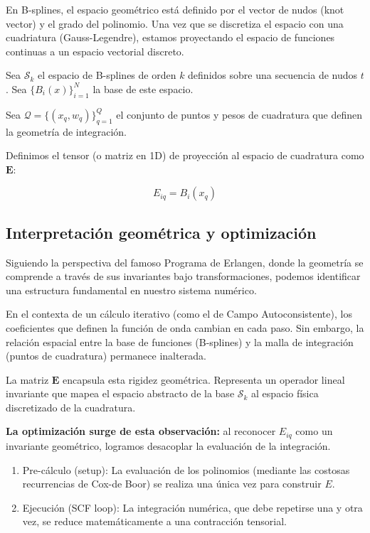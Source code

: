 \documentclass[12pt, a4paper, oneside, spanish]{article}
\begin{document}
En B-splines, el espacio geométrico está definido por el vector de nudos (knot vector) y el grado del polinomio. Una vez que se discretiza el espacio con una cuadriatura (Gauss-Legendre), estamos proyectando el espacio de funciones continuas a un espacio vectorial discreto.

\begin{definition}

  Sea \( \mathcal{S}_k \) el espacio de B-splines de orden \( k \) definidos sobre una secuencia de nudos \( t \). Sea \( \{ B_i(x) \}_{i=1}^N \) la base de este espacio.

  Sea \( \mathcal{Q} = \{ (x_q,w_q) \}_{q=1}^Q \) el conjunto de puntos y pesos de cuadratura que definen la geometría de integración.

  Definimos el tensor (o matriz en 1D) de proyección al espacio de cuadratura como \( \bm{E} \):

  \begin{equation}
    \label{eq:collocation-tensor}
    E_{iq} = B_i(x_q)
  \end{equation}

\end{definition}

\subsection{Interpretación geométrica y optimización}

Siguiendo la perspectiva del famoso Programa de Erlangen, donde la geometría se comprende a través de sus invariantes bajo transformaciones, podemos identificar una estructura fundamental en nuestro sistema numérico.

En el contexta de un cálculo iterativo (como el de Campo Autoconsistente), los coeficientes que definen la función de onda cambian en cada paso. Sin embargo, la relación espacial entre la base de funciones (B-splines) y la malla de integración (puntos de cuadratura) permanece inalterada.

La matriz \( \bm{E} \) encapsula esta rigidez geométrica. Representa un operador lineal invariante que mapea el espacio abstracto de la base \( \mathcal{S}_k \) al espacio física discretizado de la cuadratura.

\textbf{La optimización surge de esta observación:} al reconocer \( E_{iq} \) como un invariante geométrico, logramos desacoplar la evaluación de la integración.

\begin{enumerate}
\item\label{item:1} Pre-cálculo (setup): La evaluación de los polinomios (mediante las costosas recurrencias de Cox-de Boor) se realiza una única vez para construir \( E \).
\item Ejecución (SCF loop): La integración numérica, que debe repetirse una y otra vez, se reduce matemáticamente a una contracción tensorial.
\end{enumerate}
\end{document}
